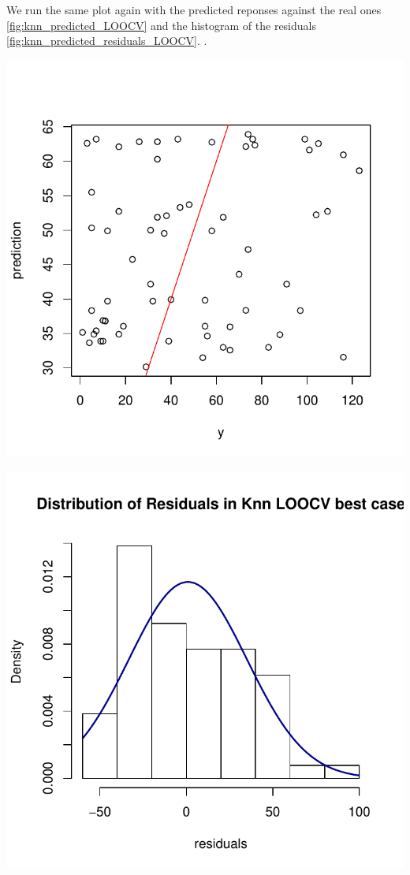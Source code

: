 \documentclass[]{report}
\begin{document}
We run the same plot again with the predicted reponses against the real ones \ref{fig:knn_predicted_LOOCV} and the histogram of the residuals \ref{fig:knn_predicted_residuals_LOOCV}.
.
\begin{center}
	\includegraphics[width=0.8\linewidth]{Figures/knn_predicted_LOOCV.pdf}
	\label{fig:knn_predicted_LOOCV}
\end{center}

\begin{center}
	\includegraphics[width=0.8\linewidth]{Figures/knn_predicted_LOOCV_residuals.pdf}
	\label{fig:knn_predicted_residuals_LOOCV}
\end{center}
\end{document}

